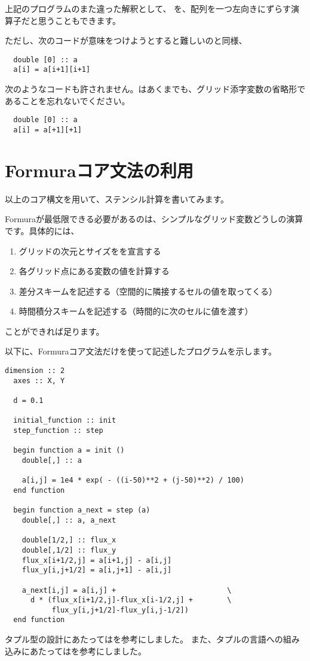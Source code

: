 \documentclass{jsarticle}
\begin{document}
上記のプログラムのまた違った解釈として、
\lit{[+1]}を、配列を一つ左向きにずらす演算子だと思うこともできます。

ただし、次のコードが意味をつけようとすると難しいのと同様、

\begin{lstlisting}
  double [0] :: a
  a[i] = a[i+1][i+1]
\end{lstlisting}

次のようなコードも許されません。\lit{[+1]}はあくまでも、グリッド添字変数の省略形であることを忘れないでください。

\begin{lstlisting}
  double [0] :: a
  a[i] = a[+1][+1]
\end{lstlisting}


\newpage

\section{Formuraコア文法の利用}

以上のコア構文を用いて、ステンシル計算を書いてみます。


Formuraが最低限できる必要があるのは、シンプルなグリッド変数どうしの演算です。具体的には、

\begin{enumerate}
\item グリッドの次元とサイズをを宣言する
\item 各グリッド点にある変数の値を計算する
\item 差分スキームを記述する（空間的に隣接するセルの値を取ってくる）
\item 時間積分スキームを記述する（時間的に次のセルに値を渡す）
\end{enumerate}

ことができれば足ります。

以下に、Formuraコア文法だけを使って記述したプログラムを示します。

\begin{lstlisting}[mathescape]
  dimension :: 2
  axes :: X, Y

  d = 0.1

  initial_function :: init
  step_function :: step

  begin function a = init ()
    double[,] :: a

    a[i,j] = 1e4 * exp( - ((i-50)**2 + (j-50)**2) / 100)
  end function

  begin function a_next = step (a)
    double[,] :: a, a_next

    double[1/2,] :: flux_x
    double[,1/2] :: flux_y
    flux_x[i+1/2,j] = a[i+1,j] - a[i,j]
    flux_y[i,j+1/2] = a[i,j+1] - a[i,j]

    a_next[i,j] = a[i,j] +                          \
      d * (flux_x[i+1/2,j]-flux_x[i-1/2,j] +        \
           flux_y[i,j+1/2]-flux_y[i,j-1/2])
  end function
\end{lstlisting}

タプル型の設計にあたっては\citet{pierce2002types}を参考にしました。
また、タプルの言語への組み込みにあたっては\citet{oliveira2015modular}を参考にしました。





\end{document}
